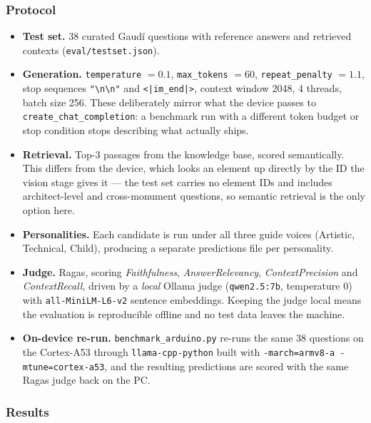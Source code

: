 \documentclass[11pt,a4paper]{article}
\begin{document}
\subsubsection{Protocol}

\begin{itemize}
  \item \textbf{Test set.} 38 curated Gaud\'i questions with reference answers
        and retrieved contexts (\texttt{eval/testset.json}).
  \item \textbf{Generation.} \texttt{temperature} $=0.1$,
        \texttt{max\_tokens} $=60$, \texttt{repeat\_penalty} $=1.1$,
        stop sequences \texttt{"\textbackslash n\textbackslash n"} and
        \texttt{<|im\_end|>}, context window 2048, 4 threads, batch size 256.
        These deliberately mirror what the device passes to
        \texttt{create\_chat\_completion}: a benchmark run with a different
        token budget or stop condition stops describing what actually ships.
  \item \textbf{Retrieval.} Top-3 passages from the knowledge base, scored
        semantically. This differs from the device, which looks an element up
        directly by the ID the vision stage gives it --- the test set carries no
        element IDs and includes architect-level and cross-monument questions,
        so semantic retrieval is the only option here.
  \item \textbf{Personalities.} Each candidate is run under all three guide
        voices (Artistic, Technical, Child), producing a separate predictions
        file per personality.
  \item \textbf{Judge.} Ragas, scoring \emph{Faithfulness},
        \emph{AnswerRelevancy}, \emph{ContextPrecision} and
        \emph{ContextRecall}, driven by a \emph{local} Ollama judge
        (\texttt{qwen2.5:7b}, temperature $0$) with
        \texttt{all-MiniLM-L6-v2} sentence embeddings. Keeping the judge local
        means the evaluation is reproducible offline and no test data leaves
        the machine.
  \item \textbf{On-device re-run.} \texttt{benchmark\_arduino.py} re-runs the
        same 38 questions on the Cortex-A53 through
        \texttt{llama-cpp-python} built with
        \texttt{-march=armv8-a -mtune=cortex-a53}, and the resulting
        predictions are scored with the same Ragas judge back on the PC.
\end{itemize}

\subsubsection{Results}
\end{document}
